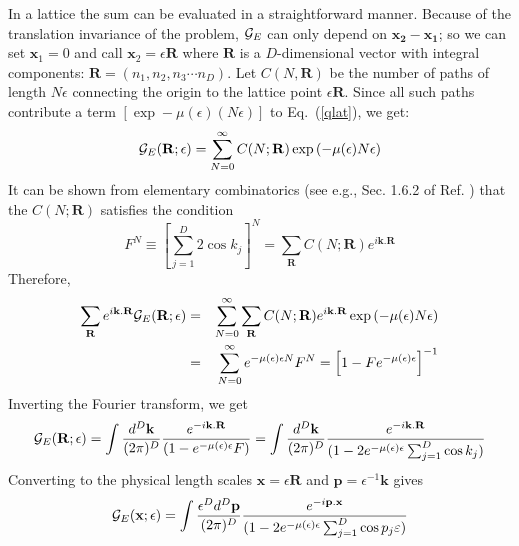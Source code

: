 \documentclass[12pt]{article}
\def\eq#1{{Eq.~(\ref{#1})}}
\begin{document}
In a lattice the sum can be evaluated in a straightforward manner.
Because of the translation invariance of the problem, ${\cal G}_E$
can only depend on $\mathbf{ x_2-x_1}$; so we can set ${\mathbf x_1}=0$
and call ${\mathbf x_2}=\epsilon {\mathbf R}$ where ${\mathbf R}$ is a
$D$-dimensional vector with integral components:
${\mathbf R}=(n_1,n_2,n_3\cdots n_D)$. Let $C(N,{\mathbf R})$ be the number of
paths of length $N\epsilon$ connecting the origin to the lattice
point $\epsilon{\mathbf R}$. Since all such paths contribute a term
$[\exp-\mu(\epsilon)(N\epsilon)]$ to \eq{qlat}, we get:
\begin{equation} 
{\cal G}_E({\mathbf R};\epsilon)=
\sum^{\infty}_{N=0}C(N;{\mathbf R})\exp\left(-\mu(\epsilon)N\epsilon \right)
\label{latticesum1}
\end{equation} 
It can be shown from elementary combinatorics (see e.g., Sec. 1.6.2 of Ref. \cite{tpqft}) that   the  
$C(N;{\mathbf R})$ satisfies the condition
\begin{equation} 
F^N\equiv\left[\sum_{j=1}^D 2\cos k_j\right]^N
=
\sum_{{\mathbf R}} C(N;{\mathbf R})e^{i\mathbf{ k.R}} 
\label{sevenfive}
\end{equation} 
Therefore,
\begin{eqnarray} 
\sum_{{\mathbf R}}e^{i\mathbf{ k.R}}
{\cal G}_E({\mathbf R};\epsilon)&=&
\sum^{\infty}_{N=0}\sum_{{\mathbf R}}C(N;{\mathbf R})
e^{i\mathbf{ k.R}}\exp\left( -\mu(\epsilon)N\epsilon\right)\nonumber\\
&=&\sum^{\infty}_{N=0}e^{-\mu(\epsilon)\epsilon  N}
F^N
=\left[1-Fe^{-\mu(\epsilon)\epsilon}\right]^{-1} 
\end{eqnarray}
Inverting the Fourier transform, we get
\begin{eqnarray}  
{\cal G}_E({\mathbf R};\epsilon)=\int
{d^D{\mathbf k}\over (2\pi)^D}
{e^{-i\mathbf{ k.R}}\over (1-e^{-\mu(\epsilon)\epsilon}F)}
=\int{d^D{\mathbf k}\over (2\pi)^D}
{e^{-i\mathbf{ k.R}}\over (1-2e^{-\mu(\epsilon)\epsilon}
\sum^D_{j=1}\cos k_j)} 
\end{eqnarray}
Converting to the physical length scales
${\mathbf x}=\epsilon{\mathbf R}$ and
${\mathbf p}=\epsilon^{-1}{\mathbf k}$ gives
\begin{equation} 
{\cal G}_E({\mathbf x};\epsilon)=
\int{\epsilon^D d^D{\mathbf p}\over(2\pi)^D}
{e^{-i\mathbf{ p.x}}\over (1-2e^{-\mu(\epsilon)\epsilon}
\sum^D_{j=1}\cos p_j\varepsilon)} 
\label{capgcape}
\end{equation} 
\end{document}
